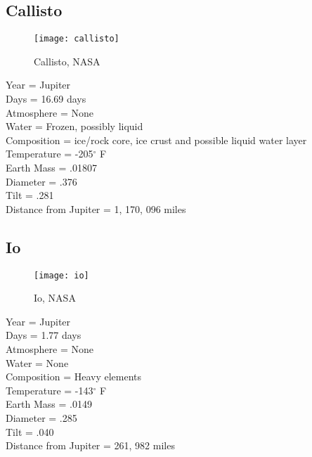 \documentclass[12pt]{book}
\begin{document}
\subsection{Callisto}
 \begin{wrapfigure}{R}{0.3\textwidth}
         \vspace{-1cm}
        \begin{center}
        \texttt{[image: callisto]}\caption{\scriptsize Callisto, NASA}
        \end{center}
         \vspace{-1cm}
    \end{wrapfigure}
Year = Jupiter\\
Days = 16.69 days\\
Atmosphere = None\\
Water = Frozen, possibly liquid\\
Composition = ice/rock core, ice crust and possible liquid water layer\\
Temperature = -205$^{\circ}$ F\\
Earth Mass = .01807\\
Diameter = .376\\ 
Tilt = .281\\
Distance from Jupiter = 1, 170, 096 miles\\
\subsection{Io}
 \begin{wrapfigure}{R}{0.3\textwidth}
         \vspace{-1cm}
        \begin{center}
        \texttt{[image: io]}\caption{\scriptsize Io, NASA}
        \end{center}
         \vspace{-1cm}
    \end{wrapfigure}
Year = Jupiter\\
Days = 1.77 days\\
Atmosphere = None\\
Water = None\\
Composition = Heavy elements\\
Temperature = -143$^{\circ}$ F\\
Earth Mass = .0149\\
Diameter = .285\\ 
Tilt = .040\\
Distance from Jupiter = 261, 982 miles\\
\newpage
\end{document}
